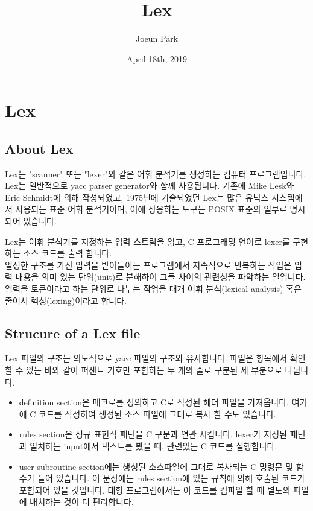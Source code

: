 \documentclass{article}
\title{Lex}
\author{Joeun Park}
\date{April 18th, 2019}
\begin{document}
\maketitle

\section{Lex}
\subsection{About Lex}
Lex는 "scanner" 또는 "lexer"와 같은 어휘 분석기를 생성하는 컴퓨터 프로그램입니다.\\
Lex는 일반적으로 yacc parser generator와 함께 사용됩니다. 기존에 Mike Lesk와 Eric Schmidt에 의해 작성되었고, 1975년에 기술되었던 Lex는 많은 유닉스 시스템에서 사용되는 표준 어휘 분석기이며, 이에 상응하는 도구는 POSIX 표준의 일부로 명시 되어 있습니다.\\
\par
Lex는 어휘 분석기를 지정하는 입력 스트림을 읽고, C 프로그래밍 언어로 lexer를 구현하는 소스 코드를 출력 합니다.\\
일정한 구조를 가진 입력을 받아들이는 프로그램에서 지속적으로 반복하는 작업은 입력 내용을 의미 있는 단위(unit)로 분해하여 그들 사이의 관련성을 파악하는 일입니다. 입력을 토큰이라고 하는 단위로 나누는 작업을 대개 어휘 분석(lexical analysis) 혹은 줄여서 렉싱(lexing)이라고 합니다.
\par

\subsection{Strucure of a Lex file}
Lex 파일의 구조는 의도적으로 yacc 파일의 구조와 유사합니다. 파일은 항목에서 확인할 수 있는 바와 같이 퍼센트 기호만 포함하는 두 개의 줄로 구분된 세 부분으로 나뉩니다.\\
\begin{itemize}
    \item definition section은 매크로를 정의하고 C로 작성된 헤더 파일을 가져옵니다. 여기에 C 코드를 작성하여 생성된 소스 파일에 그대로 복사 할 수도 있습니다.\\
    \item rules section은 정규 표현식 패턴을 C 구문과 연관 시킵니다. lexer가 지정된 패턴과 일치하는 input에서 텍스트를 봤을 때, 관련있는 C 코드를 실행합니다.\\
    \item user subroutine section에는 생성된 소스파일에 그대로 복사되는 C 명령문 및 함수가 들어 있습니다. 이 문장에는 rules section에 있는 규칙에 의해 호출된 코드가 포함되어 있을 것입니다. 대형 프로그램에서는 이 코드를 컴파일 할 때 별도의 파일에 배치하는 것이 더 편리합니다.\\
\end{itemize}
\end{document}
